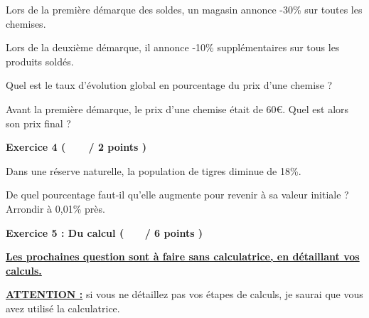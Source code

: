 \documentclass[12pt,a4paper]{exam}
\begin{document}
\vspace{10pt}
Lors de la première démarque des soldes, un magasin annonce -30\% sur toutes les chemises. 

Lors de la deuxième démarque, il annonce -10\% supplémentaires sur tous les produits soldés.

\begin{questions}

\question[2] Quel est le taux d'évolution global en pourcentage du prix d'une chemise ?

\question[1] Avant la première démarque, le prix d'une chemise était de 60€. Quel est alors son prix final ?

\end{questions}

\vspace{1cm}

\noindent
\textbf{Exercice 4 (\ \ \ \  / 2 points )}

\vspace{10pt}
Dans une réserve naturelle, la population de tigres diminue de 18\%. 

\begin{questions}

\question[2] De quel pourcentage faut-il qu'elle augmente pour revenir à sa valeur initiale ?
Arrondir à 0,01\% près.

\end{questions}

\vspace{1cm}

\noindent
\textbf{Exercice 5 : Du calcul ( \ \ \ / 6 points )}

\vspace{10pt}
\textbf{\underline{Les prochaines question sont à faire sans calculatrice, en détaillant vos calculs.}}

\vspace{5pt}
\textbf{\underline{ATTENTION :}} si vous ne détaillez pas vos étapes de calculs, je saurai que vous avez 
utilisé la calculatrice.
  
\end{document}
